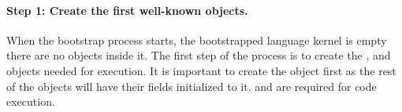 

%

\paragraph{\textbf{Step 1: Create the first well-known objects.}}\label{sec:create_nil}

When the bootstrap process starts, the bootstrapped language kernel is empty \ie there are no objects inside it. 
The first step of the process is to create the ,  and  objects needed for execution. It is important to create the  object first as the rest of the objects will have their fields initialized to it.  and  are required for code execution.
%

